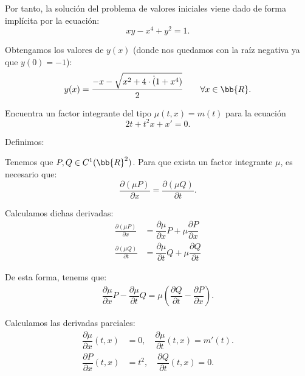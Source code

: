 \documentclass[12pt]{article}
\begin{document}
\begin{ejercicio}
    Por tanto, la solución del problema de valores iniciales viene dado de forma implícita por la ecuación:
    \begin{equation*}
        xy - x^4 + y^2 = 1.
    \end{equation*}

    Obtengamos los valores de $y(x)$ (donde nos quedamos con la raíz negativa ya que $y(0)=-1$):
    \begin{equation*}
        y(x)=\dfrac{-x- \sqrt{x^2+4\cdot \dot (1+x^4)}}{2}
        \qquad \forall x\in \bb{R}.
    \end{equation*}
\end{ejercicio}

\begin{ejercicio}
    Encuentra un factor integrante del tipo $\mu(t,x) = m(t)$ para la ecuación
    \begin{equation*}
        2t + t^2x + x' = 0.
    \end{equation*}

    Definimos:

    Tenemos que $P,Q\in C^1(\bb{R}^2)$. Para que exista un factor integrante $\mu$, es necesario que:
    \begin{equation*}
        \frac{\partial (\mu P)}{\partial x} = \frac{\partial (\mu Q)}{\partial t}.
    \end{equation*}

    Calculamos dichas derivadas:
    \begin{align*}
        \frac{\partial (\mu P)}{\partial x} &= \dfrac{\partial \mu}{\partial x}P + \mu \dfrac{\partial P}{\partial x}\\
        \frac{\partial (\mu Q)}{\partial t} &= \dfrac{\partial \mu}{\partial t}Q + \mu \dfrac{\partial Q}{\partial t}
    \end{align*}

    De esta forma, tenems que:
    \begin{align*}
        \dfrac{\partial \mu}{\partial x}P - \dfrac{\partial \mu}{\partial t}Q = \mu\left(\dfrac{\partial Q}{\partial t} - \dfrac{\partial P}{\partial x}\right).
    \end{align*}

    Calculamos las derivadas parciales:
    \begin{align*}
        \dfrac{\partial \mu}{\partial x}(t,x)&=0, \quad \dfrac{\partial \mu}{\partial t}(t,x)=m'(t).\\
        \dfrac{\partial P}{\partial x}(t,x)&=t^2, \quad \dfrac{\partial Q}{\partial t}(t,x)=0.
    \end{align*}


\end{ejercicio}
\end{document}
